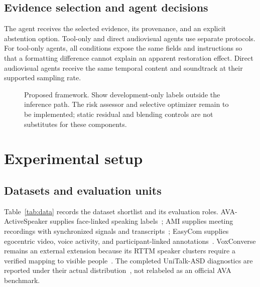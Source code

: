 \subsection{Evidence selection and agent decisions}
The agent receives the selected evidence, its provenance, and an explicit abstention option. Tool-only and direct audiovisual agents use separate protocols. For tool-only agents, all conditions expose the same fields and instructions so that a formatting difference cannot explain an apparent restoration effect. Direct audiovisual agents receive the same temporal content and soundtrack at their supported sampling rate. 

\begin{figure}[t]
\centering
{}
\caption{Proposed framework. Show development-only labels outside the inference path. The risk assessor and selective optimizer remain to be implemented; static residual and blending controls are not substitutes for these components.}
\end{figure}

\section{Experimental setup}
\subsection{Datasets and evaluation units}
Table~\ref{tab:data} records the dataset shortlist and its evaluation roles. AVA-ActiveSpeaker supplies face-linked speaking labels~\cite{ava}; AMI supplies meeting recordings with synchronized signals and transcripts~\cite{ami}; EasyCom supplies egocentric video, voice activity, and participant-linked annotations~\cite{easycom}. VoxConverse remains an external extension because its RTTM speaker clusters require a verified mapping to visible people~\cite{voxconverse}. The completed UniTalk-ASD diagnostics are reported under their actual distribution~\cite{unitalk}, not relabeled as an official AVA benchmark.

